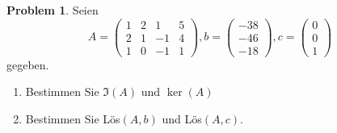 \documentclass[prb,12pt]{revtex4-2}
\theoremstyle{definition}
\newtheorem{Problem}{Problem}
\theoremstyle{definition}
\newenvironment{parts}{\begin{enumerate}[label=(\alph*)]}{\end{enumerate}}
\begin{document}
\begin{Problem}
	Seien
	\[A=\begin{pmatrix} 1 & 2 & 1 & 5 \\ 2 & 1 & -1 & 4 \\ 1 & 0 & -1 & 1 \end{pmatrix}, b=\begin{pmatrix} -38 \\ -46 \\ -18 \end{pmatrix} , c=\begin{pmatrix} 0 \\ 0 \\ 1 \end{pmatrix}  \]
	gegeben.
	\begin{parts}
	\item Bestimmen Sie $\Im(A)$ und $\ker(A)$ 
	\item Bestimmen Sie L\"{o}s$(A, b)$ und L\"{o}s$(A, c)$.
	\end{parts}
\end{Problem}
\end{document}
